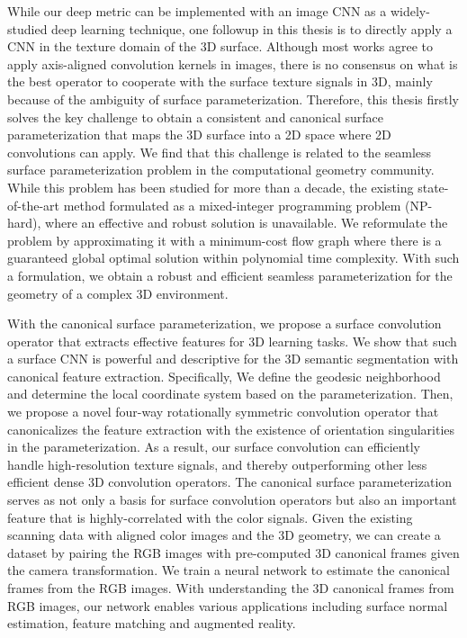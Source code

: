 While our deep metric can be implemented with an image CNN as a widely-studied deep learning technique, one followup in this thesis is to directly apply a CNN in the texture domain of the 3D surface.
%
Although most works agree to apply axis-aligned convolution kernels in images, there is no consensus on what is the best operator to cooperate with the surface texture signals in 3D, mainly because of the ambiguity of surface parameterization.
%
Therefore, this thesis firstly solves the key challenge to obtain a consistent and canonical surface parameterization that maps the 3D surface into a 2D space where 2D convolutions can apply.
%
We find that this challenge is related to the seamless surface parameterization problem in the computational geometry community. While this problem has been studied for more than a decade, the existing state-of-the-art method formulated as a mixed-integer programming problem (NP-hard), where an effective and robust solution is unavailable.
%
We reformulate the problem by approximating it with a minimum-cost flow graph where there is a guaranteed global optimal solution within polynomial time complexity. With such a formulation, we obtain a robust and efficient seamless parameterization for the geometry of a complex 3D environment.


With the canonical surface parameterization, we propose a surface convolution operator that extracts effective features for 3D learning tasks.
%
We show that such a surface CNN is powerful and descriptive for the 3D semantic segmentation with canonical feature extraction.
%
Specifically, We define the geodesic neighborhood and determine the local coordinate system based on the parameterization.
Then, we propose a novel four-way rotationally symmetric convolution operator that canonicalizes the feature extraction with the existence of orientation singularities in the parameterization.
%
As a result, our surface convolution can efficiently handle high-resolution texture signals, and thereby outperforming other less efficient dense 3D convolution operators.
%
The canonical surface parameterization serves as not only a basis for surface convolution operators but also an important feature that is highly-correlated with the color signals.
%
Given the existing scanning data with aligned color images and the 3D geometry, we can create a dataset by pairing the RGB images with pre-computed 3D canonical frames given the camera transformation.
%
We train a neural network to estimate the canonical frames from the RGB images. With understanding the 3D canonical frames from RGB images, our network enables various applications including surface normal estimation, feature matching and augmented reality.